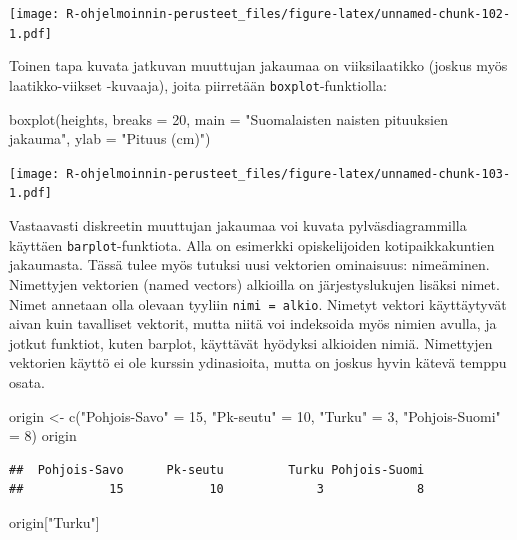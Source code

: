 \documentclass[
]{book}
\newenvironment{Shaded}{\begin{snugshade}}{\end{snugshade}}
\newcommand{\AttributeTok}[1]{\textcolor[rgb]{0.77,0.63,0.00}{#1}}
\newcommand{\DecValTok}[1]{\textcolor[rgb]{0.00,0.00,0.81}{#1}}
\newcommand{\FunctionTok}[1]{\textcolor[rgb]{0.00,0.00,0.00}{#1}}
\newcommand{\NormalTok}[1]{#1}
\newcommand{\OtherTok}[1]{\textcolor[rgb]{0.56,0.35,0.01}{#1}}
\newcommand{\StringTok}[1]{\textcolor[rgb]{0.31,0.60,0.02}{#1}}
\begin{document}
\texttt{[image: R-ohjelmoinnin-perusteet\_files/figure-latex/unnamed-chunk-102-1.pdf]}

Toinen tapa kuvata jatkuvan muuttujan jakaumaa on viiksilaatikko (joskus myös laatikko-viikset -kuvaaja), joita piirretään \texttt{boxplot}-funktiolla:

\begin{Shaded}
\begin{Highlighting}[]
\FunctionTok{boxplot}\NormalTok{(heights, }\AttributeTok{breaks =} \DecValTok{20}\NormalTok{, }
     \AttributeTok{main =} \StringTok{"Suomalaisten naisten pituuksien jakauma"}\NormalTok{,}
     \AttributeTok{ylab =} \StringTok{"Pituus (cm)"}\NormalTok{)}
\end{Highlighting}
\end{Shaded}

\texttt{[image: R-ohjelmoinnin-perusteet\_files/figure-latex/unnamed-chunk-103-1.pdf]}

Vastaavasti diskreetin muuttujan jakaumaa voi kuvata pylväsdiagrammilla käyttäen \texttt{barplot}-funktiota. Alla on esimerkki opiskelijoiden kotipaikkakuntien jakaumasta. Tässä tulee myös tutuksi uusi vektorien ominaisuus: nimeäminen. Nimettyjen vektorien (named vectors) alkioilla on järjestyslukujen lisäksi nimet. Nimet annetaan olla olevaan tyyliin \texttt{nimi\ =\ alkio}. Nimetyt vektori käyttäytyvät aivan kuin tavalliset vektorit, mutta niitä voi indeksoida myös nimien avulla, ja jotkut funktiot, kuten barplot, käyttävät hyödyksi alkioiden nimiä. Nimettyjen vektorien käyttö ei ole kurssin ydinasioita, mutta on joskus hyvin kätevä temppu osata.

\begin{Shaded}
\begin{Highlighting}[]
\NormalTok{origin }\OtherTok{\textless{}{-}} \FunctionTok{c}\NormalTok{(}\StringTok{"Pohjois{-}Savo"} \OtherTok{=} \DecValTok{15}\NormalTok{, }\StringTok{"Pk{-}seutu"} \OtherTok{=} \DecValTok{10}\NormalTok{, }\StringTok{"Turku"} \OtherTok{=} \DecValTok{3}\NormalTok{,}
            \StringTok{"Pohjois{-}Suomi"} \OtherTok{=} \DecValTok{8}\NormalTok{)}
\NormalTok{origin}
\end{Highlighting}
\end{Shaded}

\begin{verbatim}
##  Pohjois-Savo      Pk-seutu         Turku Pohjois-Suomi 
##            15            10             3             8
\end{verbatim}

\begin{Shaded}
\begin{Highlighting}[]
\NormalTok{origin[}\StringTok{"Turku"}\NormalTok{]}
\end{Highlighting}
\end{Shaded}
\end{document}
